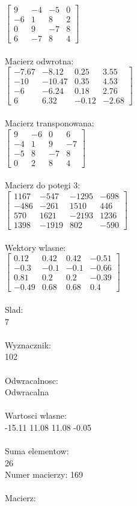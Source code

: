 \documentclass[a4paper,12pt]{article}
\begin{document}
$\begin{bmatrix} 9&-4&-5&0\\-6&1&8&2\\0&9&-7&8\\6&-7&8&4 \end{bmatrix}$
\\
\\
Macierz odwrotna:\\

$\begin{bmatrix} -7.67&-8.12&0.25&3.55\\-10&-10.47&0.35&4.53\\-6&-6.24&0.18&2.76\\6&6.32&-0.12&-2.68 \end{bmatrix}$
\\
\\
Macierz transponowana:\\

$\begin{bmatrix} 9&-6&0&6\\-4&1&9&-7\\-5&8&-7&8\\0&2&8&4 \end{bmatrix}$
\\
\\
Macierz do potegi 3:\\

$\begin{bmatrix} 1167&-547&-1295&-698\\-486&-261&1510&446\\570&1621&-2193&1236\\1398&-1919&802&-590 \end{bmatrix}$
\\
\\
Wektory wlasne:\\

$\begin{bmatrix} 0.12&0.42&0.42&-0.51\\-0.3&-0.1&-0.1&-0.66\\0.81&0.2&0.2&-0.39\\-0.49&0.68&0.68&0.4 \end{bmatrix}$
\\
\\
Slad:\\
7
\\
\\
Wyznacznik:\\
102
\\
\\
Odwracalnosc:\\
Odwracalna
\\
\\
Wartosci wlasne:\\
-15.11 11.08 11.08 -0.05
\\
\\
Suma elementow:\\
26
\\
\newpage
Numer macierzy:
169
\\
\\
Macierz:\\
\end{document}
